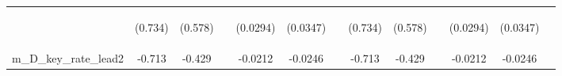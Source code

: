 \documentclass[]{article}
\begin{document}
\begin{center}
\begin{tabular}{lcccccccccccc}
\vspace{4pt} & \begin{footnotesize}(0.734)\end{footnotesize} & \begin{footnotesize}(0.578)\end{footnotesize} & \begin{footnotesize}\end{footnotesize} & \begin{footnotesize}(0.0294)\end{footnotesize} & \begin{footnotesize}(0.0347)\end{footnotesize} & \begin{footnotesize}\end{footnotesize} & \begin{footnotesize}(0.734)\end{footnotesize} & \begin{footnotesize}(0.578)\end{footnotesize} & \begin{footnotesize}\end{footnotesize} & \begin{footnotesize}(0.0294)\end{footnotesize} & \begin{footnotesize}(0.0347)\end{footnotesize} & \begin{footnotesize}\end{footnotesize} \\
m\_D\_key\_rate\_lead2 & -0.713 & -0.429 &  & -0.0212 & -0.0246 &  & -0.713 & -0.429 &  & -0.0212 & -0.0246 &  \\

\end{tabular}
\end{center}
\end{document}
